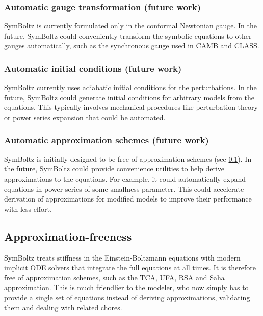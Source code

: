 \documentclass{aa}
\begin{document}
\subsubsection{Automatic gauge transformation (future work)}
\label{sec:gauges}

SymBoltz is currently formulated only in the conformal Newtonian gauge.
In the future, SymBoltz could conveniently transform the symbolic equations to other gauges automatically, such as the synchronous gauge used in CAMB and CLASS.

\subsubsection{Automatic initial conditions (future work)}
\label{sec:ics}

SymBoltz currently uses adiabatic initial conditions for the perturbations.
In the future, SymBoltz could generate initial conditions for arbitrary models from the equations.
This typically involves mechanical procedures like perturbation theory or power series expansion that could be automated.

\subsubsection{Automatic approximation schemes (future work)}
\label{sec:approximations}

SymBoltz is initially designed to be free of approximation schemes (see \cref{sec:approx-free}).
In the future, SymBoltz could provide convenience utilities to help derive approximations to the equations.
For example, it could automatically expand equations in power series of some smallness parameter.
This could accelerate derivation of approximations for modified models to improve their performance with less effort.

\subsection{Approximation-freeness}
\label{sec:approx-free}

SymBoltz treats stiffness in the Einstein-Boltzmann equations with modern implicit ODE solvers that integrate the full equations at all times.
It is therefore free of approximation schemes, such as the TCA, UFA, RSA and Saha approximation.
This is much friendlier to the modeler, who now simply has to provide a single set of equations instead of deriving approximations, validating them and dealing with related chores.
\end{document}
